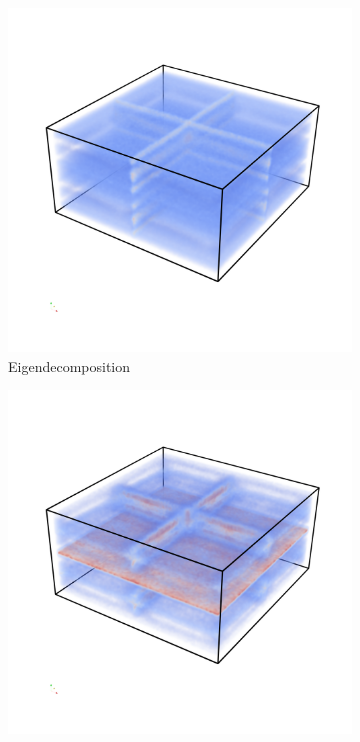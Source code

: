 \begin{figure}
    \begin{subfigure}[b]{0.49\textwidth}
        \includegraphics[width=\textwidth]{Images/highuncEigen.png}
        \caption{Eigendecomposition}
        \label{fig:HUCeigen}
    \end{subfigure}
    \begin{subfigure}[b]{0.49\textwidth}
        \includegraphics[width=\textwidth]{Images/highuncChol.png}

\end{subfigure}
\end{figure}
